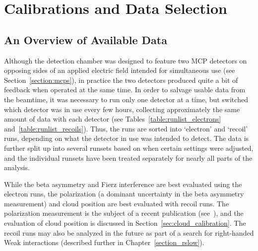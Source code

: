 %
%
%
\clearpage
\chapter{Calibrations and Data Selection}
\label{calibrations_chapter}
\label{dataselection_chapter}
\section{An Overview of Available Data}
\label{sec:data_overview}
Although the detection chamber was designed to feature two MCP detectors on opposing sides of an applied electric field intended for simultaneous use (see Section~\ref{section:mcps}), in practice the two detectors produced quite a bit of feedback when operated at the same time.  In order to salvage usable data from the beamtime, it was necessary to run only one detector at a time, but switched which detector was in use every few hours, collecting approximately the same amount of data with each detector (see Tables~\ref{table:runlist_electrons} and~\ref{table:runlist_recoils}).  Thus, the runs are sorted into `electron' and `recoil' runs, depending on what the detector in use was intended to detect.  The data is further split up into several runsets based on when certain settings were adjusted, and the individual runsets have been treated separately for nearly all parts of the analysis.  




While the beta asymmetry and Fierz interference are best evaluated using the electron runs, the polarization (a dominant uncertainty in the beta asymmetry measurement) and cloud position are best evaluated with recoil runs.  The polarization measurement is the subject of a recent publication (see~\cite{ben_OP}), and the evaluation of cloud position is discussed in Section~\ref{sec:cloud_calibration}.  
The recoil runs may also be analyzed in the future as part of a search for right-handed Weak interactions (described further in Chapter~\ref{section_rslow}).

